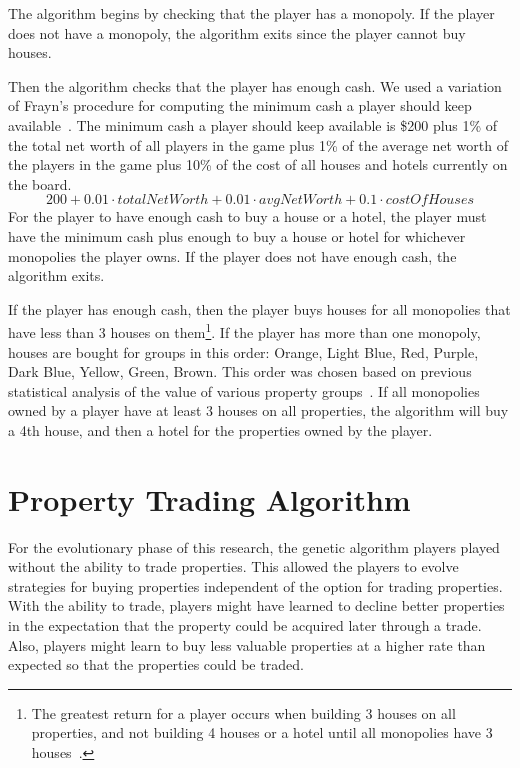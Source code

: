 The algorithm begins by checking that the player has a monopoly. If the player
does not have a monopoly, the algorithm exits since the player cannot buy
houses.

Then the algorithm checks that the player has enough cash. We used a variation 
of Frayn's procedure for computing the minimum cash a player should keep
available~\cite{DBLP:conf/cig/Frayn05}. The minimum cash a player should keep
available is \$200 plus 1\% of the total net worth of all players in the game
plus 1\% of the average net worth of the players in the game plus 10\% of the
cost of all houses and hotels currently on the board.
\begin{equation*}
200 + 0.01 \cdot totalNetWorth + 0.01 \cdot avgNetWorth + 0.1 \cdot costOfHouses
\end{equation*}
For the player to have enough cash to buy a house or a hotel, the player must
have the minimum cash plus enough to buy a house or hotel for whichever
monopolies the player owns. If the player does not have enough cash, the
algorithm exits.

If the player has enough cash, then the player buys houses for all monopolies
that have less than 3 houses on them\footnote{The greatest return for a player
occurs when building 3 houses on all properties, and not building 4 houses or a
hotel until all monopolies have 3 houses~\cite{orbanes2007monopoly}.}. If the
player has more than one monopoly, houses are bought for groups in this order:
Orange, Light Blue, Red, Purple, Dark Blue, Yellow, Green, Brown. This order was
chosen based on previous statistical analysis of the value of various property
groups~\cite{Ash1972,Abbott1997,DBLP:conf/cig/Frayn05}. If all monopolies owned
by a player have at least 3 houses on all properties, the algorithm will buy a
4th house, and then a hotel for the properties owned by the player.

\section{Property Trading Algorithm} \label{5_trade_property}

For the evolutionary phase of this research, the genetic algorithm players
played without the ability to trade properties. This allowed the players to
evolve strategies for buying properties independent of the option for trading
properties. With the ability to trade, players might have learned to decline
better properties in the expectation that the property could be acquired later
through a trade. Also, players might learn to buy less valuable properties at a
higher rate than expected so that the properties could be traded.

